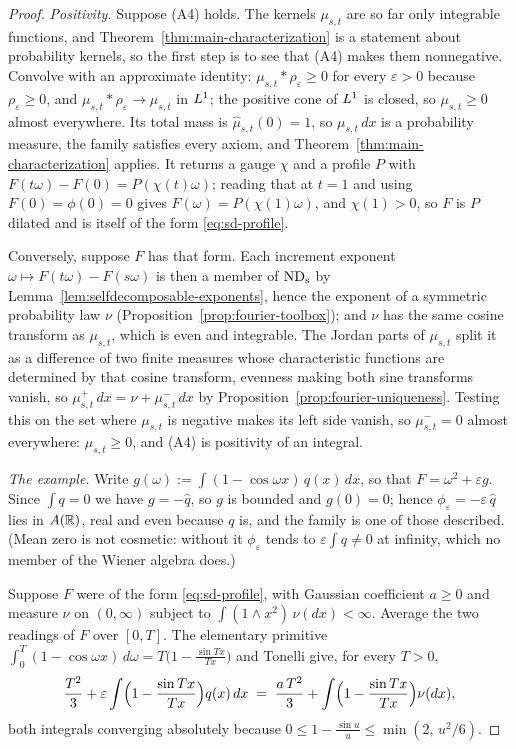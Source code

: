\begin{proof}
\emph{Positivity.} Suppose (A4) holds. The kernels $\mu_{s,t}$ are so far only integrable
functions, and Theorem~\ref{thm:main-characterization} is a statement about probability
kernels, so the first step is to see that (A4) makes them nonnegative. Convolve with an
approximate identity: $\mu_{s,t} * \rho_\varepsilon \ge 0$ for every $\varepsilon > 0$ because
$\rho_\varepsilon \ge 0$, and $\mu_{s,t} * \rho_\varepsilon \to \mu_{s,t}$ in $L^1$; the
positive cone of $L^1$ is closed, so $\mu_{s,t} \ge 0$ almost everywhere. Its total mass is
$\hat\mu_{s,t}(0) = 1$, so $\mu_{s,t}\,dx$ is a probability measure, the family satisfies
every axiom, and Theorem~\ref{thm:main-characterization} applies. It returns a gauge $\chi$
and a profile $P$ with $F(t\omega) - F(0) = P(\chi(t)\omega)$; reading that at $t = 1$ and
using $F(0) = \phi(0) = 0$ gives $F(\omega) = P(\chi(1)\omega)$, and $\chi(1) > 0$, so $F$ is
$P$ dilated and is itself of the form \ref{eq:sd-profile}.

Conversely, suppose $F$ has that form. Each increment exponent
$\omega \mapsto F(t\omega) - F(s\omega)$ is then a member of $\mathrm{ND}_{\mathrm{s}}$ by
Lemma~\ref{lem:selfdecomposable-exponents}, hence the exponent of a symmetric probability
law $\nu$ (Proposition~\ref{prop:fourier-toolbox}); and $\nu$ has the same cosine transform
as $\mu_{s,t}$, which is even and integrable. The Jordan parts of $\mu_{s,t}$ split it as a
difference of two finite measures whose characteristic functions are determined by that
cosine transform, evenness making both sine transforms vanish, so
$\mu_{s,t}^+\,dx = \nu + \mu_{s,t}^-\,dx$ by Proposition~\ref{prop:fourier-uniqueness}.
Testing this on the set where $\mu_{s,t}$ is negative makes its left side vanish, so
$\mu_{s,t}^- = 0$ almost everywhere: $\mu_{s,t} \ge 0$, and (A4) is positivity of an
integral.

\emph{The example.} Write $g(\omega) := \int (1 - \cos\omega x)\,q(x)\,dx$, so that
$F = \omega^2 + \varepsilon g$. Since $\int q = 0$ we have $g = -\hat q$, so $g$ is bounded and
$g(0) = 0$; hence $\phi_\varepsilon = -\varepsilon\,\hat q$ lies in $A(\mathbb{R})$, real and even
because $q$ is, and the family is one of those described. (Mean zero is not cosmetic: without
it $\phi_\varepsilon$ tends to $\varepsilon\int q \ne 0$ at infinity, which no member of the
Wiener algebra does.)

Suppose $F$ were of the form \ref{eq:sd-profile}, with Gaussian coefficient $a \ge 0$ and
\Levy{} measure $\nu$ on $(0,\infty)$ subject to $\int (1 \wedge x^2)\,\nu(dx) < \infty$.
Average the two readings of $F$ over $[0,T]$. The elementary primitive
$\int_0^T (1 - \cos\omega x)\,d\omega = T\bigl(1 - \frac{\sin Tx}{Tx}\bigr)$ and Tonelli give,
for every $T > 0$,
\[
  \frac{T^2}{3}
   + \varepsilon\int \Bigl(1 - \frac{\sin Tx}{Tx}\Bigr) q(x)\,dx
  \;=\; \frac{a\,T^2}{3}
   + \int \Bigl(1 - \frac{\sin Tx}{Tx}\Bigr) \nu(dx),
\]
both integrals converging absolutely because
$0 \le 1 - \frac{\sin u}{u} \le \min(2,\, u^2/6)$.


\end{proof}
